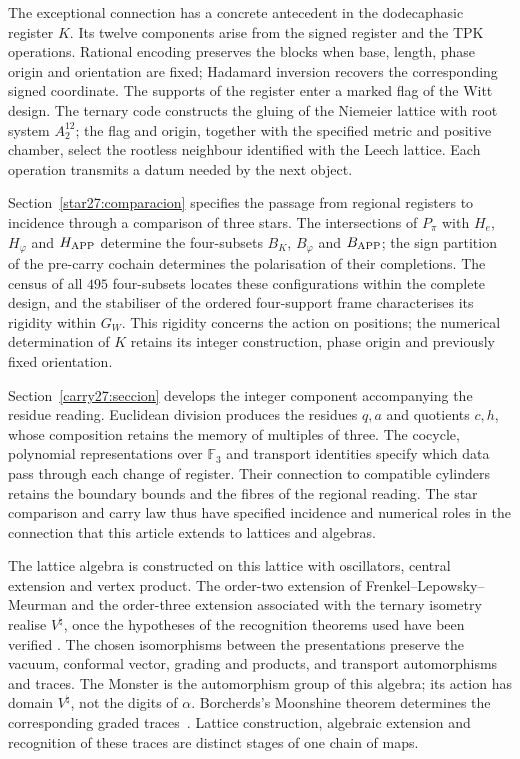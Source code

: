 The exceptional connection has a concrete antecedent in the
dodecaphasic register \(K\). Its twelve components arise from the
signed register and the TPK operations. Rational encoding preserves
the blocks when base, length, phase origin and orientation are fixed;
Hadamard inversion recovers the corresponding signed coordinate.
The supports of the register enter a marked flag of the Witt design.
The ternary code constructs the gluing of the Niemeier lattice with
root system \(A_2^{12}\); the flag and origin, together with the
specified metric and positive chamber, select the rootless neighbour
identified with the Leech lattice. Each operation transmits a datum
needed by the next object.

Section~\ref{star27:comparacion} specifies the passage from regional
registers to incidence through a comparison of three stars.
The intersections of \(P_\pi\) with \(H_e\), \(H_\varphi\) and
\(H_{\rm APP}\) determine the four-subsets \(B_K\), \(B_\varphi\)
and \(B_{\rm APP}\); the sign partition of the pre-carry cochain
determines the polarisation of their completions. The census of
all \(495\) four-subsets locates these configurations within the
complete design, and the stabiliser of the ordered four-support
frame characterises its rigidity within \(G_W\). This rigidity
concerns the action on positions; the numerical determination of
\(K\) retains its integer construction, phase origin and previously
fixed orientation.

Section~\ref{carry27:seccion} develops the integer component accompanying
the residue reading. Euclidean division produces the residues \(q,a\)
and quotients \(c,h\), whose composition retains the memory of multiples
of three. The cocycle, polynomial representations over \(\mathbb F_3\)
and transport identities specify which data pass through each change
of register. Their connection to compatible cylinders retains the
boundary bounds and the fibres of the regional reading. The star
comparison and carry law thus have specified incidence and numerical
roles in the connection that this article extends to lattices and
algebras.



The lattice algebra is constructed on this lattice with oscillators,
central extension and vertex product. The order-two extension of
Frenkel--Lepowsky--Meurman and the order-three extension associated
with the ternary isometry realise \(V^\natural\), once the hypotheses
of the recognition theorems used have been verified
\cite{flm,chenlamshimakura2016,abelamyamada2017}.
The chosen isomorphisms between the presentations preserve the vacuum,
conformal vector, grading and products, and transport automorphisms
and traces. The Monster is the automorphism group of this algebra;
its action has domain \(V^\natural\), not the digits of \(\alpha\).
Borcherds's Moonshine theorem determines the corresponding graded
traces~\cite{borcherds}. Lattice construction, algebraic extension and
recognition of these traces are distinct stages of one chain of maps.

